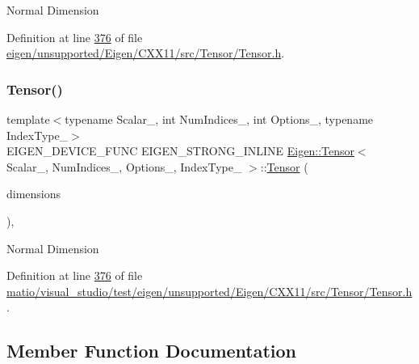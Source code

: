 Normal Dimension 

Definition at line \hyperlink{eigen_2unsupported_2_eigen_2_c_x_x11_2src_2_tensor_2_tensor_8h_source_l00376}{376} of file \hyperlink{eigen_2unsupported_2_eigen_2_c_x_x11_2src_2_tensor_2_tensor_8h_source}{eigen/unsupported/\+Eigen/\+C\+X\+X11/src/\+Tensor/\+Tensor.\+h}.

\mbox{\label{class_eigen_1_1_tensor_a6ef6b578cd0ca367842b0d8888e22195}} 
\subsubsection{\texorpdfstring{Tensor()}{Tensor()}\hspace{0.1cm}{\footnotesize\ttfamily [2/2]}}
{\footnotesize\ttfamily template$<$typename Scalar\+\_\+, int Num\+Indices\+\_\+, int Options\+\_\+, typename Index\+Type\+\_\+$>$ \\
E\+I\+G\+E\+N\+\_\+\+D\+E\+V\+I\+C\+E\+\_\+\+F\+U\+NC E\+I\+G\+E\+N\+\_\+\+S\+T\+R\+O\+N\+G\+\_\+\+I\+N\+L\+I\+NE \hyperlink{class_eigen_1_1_tensor}{Eigen\+::\+Tensor}$<$ Scalar\+\_\+, Num\+Indices\+\_\+, Options\+\_\+, Index\+Type\+\_\+ $>$\+::\hyperlink{class_eigen_1_1_tensor}{Tensor} (\begin{DoxyParamCaption}\item[{const \hyperlink{class_eigen_1_1array}{array}$<$ Index, Num\+Indices $>$ \&}]{dimensions }\end{DoxyParamCaption})\hspace{0.3cm}{\ttfamily [inline]}, {\ttfamily [explicit]}}

Normal Dimension 

Definition at line \hyperlink{matio_2visual__studio_2test_2eigen_2unsupported_2_eigen_2_c_x_x11_2src_2_tensor_2_tensor_8h_source_l00376}{376} of file \hyperlink{matio_2visual__studio_2test_2eigen_2unsupported_2_eigen_2_c_x_x11_2src_2_tensor_2_tensor_8h_source}{matio/visual\+\_\+studio/test/eigen/unsupported/\+Eigen/\+C\+X\+X11/src/\+Tensor/\+Tensor.\+h}.



\subsection{Member Function Documentation}
\mbox{\label{class_eigen_1_1_tensor_a5ab1ec6dc9b05d5e4db3600bc9d2cc6b}} 
